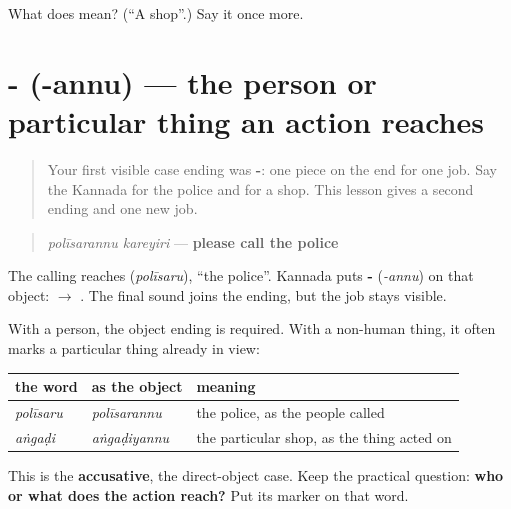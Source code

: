 \begin{tcolorbox}[breakable,colback=teal!4,colframe=teal!35!black,title={Before you move on}]
What does  mean? (\textquotedblleft{}A shop\textquotedblright{}.) Say it once more.
\end{tcolorbox}
\section[\texorpdfstring{-\kn{ಅನ್ನು} (-annu)}{-ಅನ್ನು (-annu)}]{- (-annu) — the person or particular thing an action reaches}

\label{lesson:KA-C104-accusative-annu}



\begin{quote}
Your first visible case ending was \textbf{-}: one piece on the end for one job. Say the Kannada for the police and for a shop. This lesson gives a second ending and one new job.
\end{quote}

\begin{grammarlens}[title={Grammar Lens: -\kn{ಅನ್ನು} marks the object}]
\begin{quote}
\textbf{ }
\end{quote}

\begin{quote}
\emph{polīsarannu kareyiri} — \textbf{please call the police}
\end{quote}

The calling reaches \textbf{} (\emph{polīsaru}), “the police”. Kannada puts \textbf{-} (\emph{-annu}) on that object: \textbf{ $\to$ }. The final sound joins the ending, but the job stays visible.

With a person, the object ending is required. With a non-human thing, it often marks a particular thing already in view:

\noindent
\begin{tabularx}{\linewidth}{@{}>{\raggedright\arraybackslash}X>{\raggedright\arraybackslash}X>{\raggedright\arraybackslash}X@{}}
\toprule
\textbf{the word} & \textbf{as the object} & \textbf{meaning} \\
\midrule
\kn{ಪೊಲೀಸರು} \emph{polīsaru} & \kn{ಪೊಲೀಸರನ್ನು} \emph{polīsarannu} & the police, as the people called \\
\kn{ಅಂಗಡಿ} \emph{aṅgaḍi} & \kn{ಅಂಗಡಿಯನ್ನು} \emph{aṅgaḍiyannu} & the particular shop, as the thing acted on \\
\bottomrule
\end{tabularx}

This is the \textbf{accusative}, the direct-object case. Keep the practical question: \textbf{who or what does the action reach?} Put its marker on that word.
\end{grammarlens}

